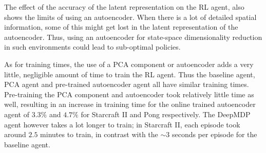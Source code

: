 The effect of the accuracy of the latent representation on the RL agent, also shows the limits of using an autoencoder. When there is a lot of detailed spatial information, some of this might get lost in the latent representation of the autoencoder. Thus, using an autoencoder for state-space dimensionality reduction in such environments could lead to sub-optimal policies.

As for training times, the use of a PCA component or autoencoder adds a very little, negligible amount of time to train the RL agent. Thus the baseline agent, PCA agent and pre-trained autoencoder agent all have similar training times. Pre-training the PCA component and autoencoder took relatively little time as well, resulting in an increase in training time for the online trained autoencoder agent of $3.3\%$ and $4.7\%$ for Starcraft II and Pong respectively. The DeepMDP agent however takes a lot longer to train; in Starcraft II, each episode took around $2.5$ minutes to train, in contrast with the $\sim3$ seconds per episode for the baseline agent.